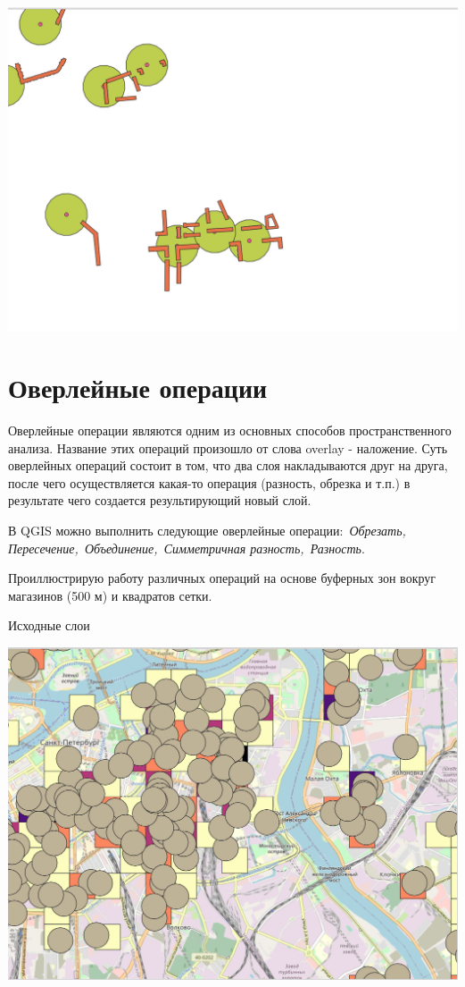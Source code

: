 \documentclass[
]{book}
\begin{document}
\includegraphics{figures/52.png}

\hypertarget{ux43eux432ux435ux440ux43bux435ux439ux43dux44bux435-ux43eux43fux435ux440ux430ux446ux438ux438}{%
\section{Оверлейные операции}\label{ux43eux432ux435ux440ux43bux435ux439ux43dux44bux435-ux43eux43fux435ux440ux430ux446ux438ux438}}

Оверлейные операции являются одним из основных способов пространственного анализа. Название этих операций произошло от слова overlay - наложение. Суть оверлейных операций состоит в том, что два слоя накладываются друг на друга, после чего осуществляется какая-то операция (разность, обрезка и т.п.) в результате чего создается результирующий новый слой.

В QGIS можно выполнить следующие оверлейные операции:~\emph{Обрезать, Пересечение,~Объединение,~Симметричная разность,~Разность}.

Проиллюстрирую работу различных операций на основе буферных зон вокруг магазинов (500 м) и квадратов сетки.

Исходные слои

\includegraphics{figures/53.PNG}
\end{document}

